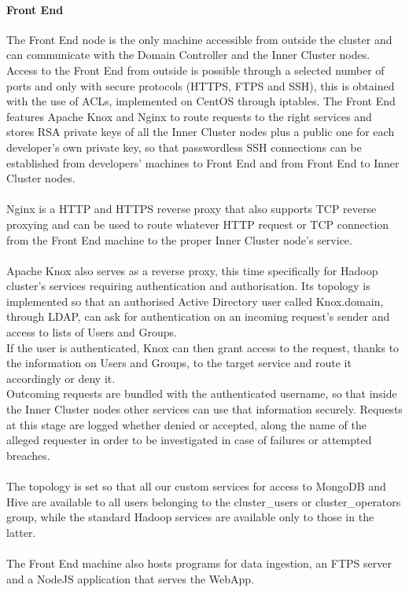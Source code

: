 \paragraph{Front End}
The Front End node is the only machine accessible from outside the cluster and can communicate with the Domain Controller and the Inner Cluster nodes. \\
Access to the Front End from outside is possible through a selected number of ports and only with secure protocols (HTTPS, FTPS and SSH), this is obtained with the use of ACLs, implemented on CentOS through iptables. The Front End features Apache Knox and Nginx to route requests to the right services and stores RSA private keys of all the Inner Cluster nodes plus a public one for each developer's own private key, so that passwordless SSH connections can be established from developers' machines to Front End and from Front End to Inner Cluster nodes. \\
\\
Nginx is a HTTP and HTTPS reverse proxy that also supports TCP reverse proxying and can be used to route whatever HTTP request or TCP connection from the Front End machine to the proper Inner Cluster node's service. \\
\\
Apache Knox also serves as a reverse proxy, this time specifically for Hadoop cluster's services requiring authentication and authorisation. Its topology is implemented so that an authorised Active Directory user called Knox.domain, through LDAP, can ask for authentication on an incoming request's sender and access to lists of Users and Groups.\\ If the user is authenticated, Knox can then grant access to the request, thanks to the information on Users and Groups, to the target service and route it accordingly or deny it. \\ Outcoming requests are bundled with the authenticated username, so that inside the Inner Cluster nodes other services can use that information securely. Requests at this stage are logged whether denied or accepted, along the name of the alleged requester in order to be investigated in case of failures or attempted breaches.\\ \\
The topology is set so that all our custom services for access to MongoDB and Hive are available to all users belonging to the cluster\_users or cluster\_operators group, while the standard Hadoop services are available only to those in the latter.
\\
\\
The Front End machine also hosts programs for data ingestion, an FTPS server and a NodeJS application that serves the WebApp.

